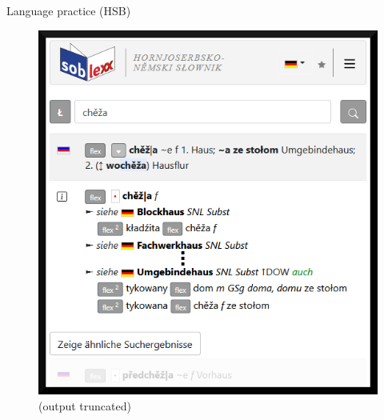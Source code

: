   \begin{block}{Language practice (HSB)}


    \begin{figure}
        \centering
        \includegraphics[width=0.7\colwidth]{05_z_01_soblex_suche_trunc_rand.png}
        \caption{(output truncated)}
        \label{fig:soblexsearch}
    \end{figure}



\end{block}
